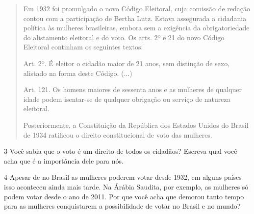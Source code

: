 \begin{quote}
Em 1932 foi promulgado o novo Código Eleitoral, cuja comissão de
redação contou com a participação de Bertha Lutz. Estava assegurada a
cidadania política às mulheres brasileiras, embora sem a exigência da
obrigatoriedade do alistamento eleitoral e do voto. Os arts. 2º e 21 do
novo Código Eleitoral continham os seguintes textos:

Art. 2º. É eleitor o cidadão maior de 21 anos, sem distinção de sexo,
alistado na forma deste Código. (...)

Art. 121. Os homens maiores de sessenta anos e as mulheres de qualquer
idade podem isentar-se de qualquer obrigação ou serviço de natureza
eleitoral.

Posteriormente, a Constituição da República dos Estados Unidos do Brasil
de 1934 ratificou o direito constitucional de voto das mulheres.

\end{quote}

\pagebreak
\num{3} Você sabia que o voto é um direito de todos os cidadãos? Escreva qual
você acha que é a importância dele para nós.


\num{4} Apesar de no Brasil as mulheres poderem votar desde 1932, em alguns
países isso aconteceu ainda mais tarde. Na Árábia Saudita, por exemplo,
as mulheres só podem votar desde o ano de 2011. Por que você acha que
demorou tanto tempo para as mulheres conquistarem a possibilidade de
votar no Brasil e no mundo?


